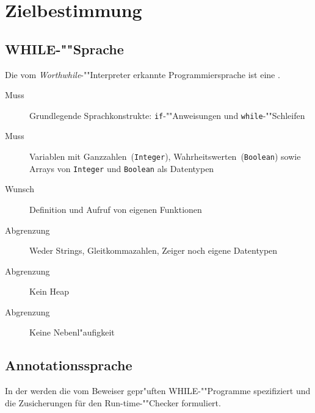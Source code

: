 \section{Zielbestimmung}%


\subsection{WHILE-""Sprache}%

Die vom \textit{Worthwhile}-""Interpreter erkannte Programmiersprache ist eine .

\begin{description}%
    \item [Muss] Grundlegende Sprachkonstrukte: \texttt{if}-""Anweisungen und \texttt{while}-""Schleifen
    \item [Muss] Variablen mit Ganzzahlen~(\texttt{Integer}), Wahrheitswerten~(\texttt{Boolean}) sowie Arrays von \texttt{Integer} und \texttt{Boolean} als Datentypen%
    \item [Wunsch] Definition und Aufruf von eigenen Funktionen%
    \item [Abgrenzung] Weder Strings, Gleitkommazahlen, Zeiger noch eigene Datentypen%
    \item [Abgrenzung] Kein Heap%
    \item [Abgrenzung] Keine Nebenl"aufigkeit%
\end{description}%

\subsection{Annotationssprache}%

In der  werden die vom Beweiser gepr"uften WHILE-""Programme spezifiziert und die Zusicherungen für den Run-time-""Checker formuliert.%

